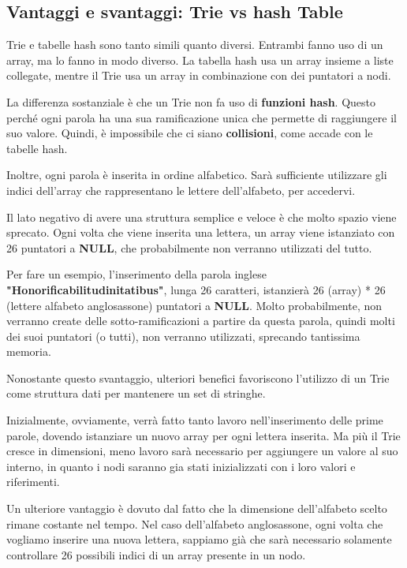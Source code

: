 \documentclass[a4paper, 12pt]{article}
\begin{document}
\subsection{Vantaggi e svantaggi: Trie vs hash Table}
Trie e tabelle hash sono tanto simili quanto diversi. Entrambi fanno uso di un array, ma lo fanno in modo diverso. La tabella hash usa un array insieme a liste collegate, mentre il Trie usa un array in combinazione con dei puntatori a nodi.

La differenza sostanziale è che un Trie non fa uso di \textbf{funzioni hash}. Questo perché ogni parola ha una sua ramificazione unica che permette di raggiungere il suo valore. Quindi, è impossibile che ci siano \textbf{collisioni}, come accade con le tabelle hash. 

Inoltre, ogni parola è inserita in ordine alfabetico. Sarà sufficiente utilizzare gli indici dell'array che rappresentano le lettere dell'alfabeto, per accedervi.

Il lato negativo di avere una struttura semplice e veloce è che molto spazio viene sprecato. Ogni volta che viene inserita una lettera, un array viene istanziato con 26 puntatori a \textbf{NULL}, che probabilmente non verranno utilizzati del tutto. 

Per fare un esempio, l'inserimento della parola inglese \textbf{"Honorificabilitudinitatibus"}, lunga 26 caratteri, istanzierà 26 (array) * 26 (lettere alfabeto anglosassone) puntatori a \textbf{NULL}. Molto probabilmente, non verranno create delle sotto-ramificazioni a partire da questa parola, quindi molti dei suoi puntatori (o tutti), non verranno utilizzati, sprecando tantissima memoria.

Nonostante questo svantaggio, ulteriori benefici favoriscono l'utilizzo di un Trie come struttura dati per mantenere un set di stringhe. 

Inizialmente, ovviamente, verrà fatto tanto lavoro nell'inserimento delle prime parole, dovendo istanziare un nuovo array per ogni lettera inserita. Ma più il Trie cresce in dimensioni, meno lavoro sarà necessario per aggiungere un valore al suo interno, in quanto i nodi saranno gia stati inizializzati con i loro valori e riferimenti.

Un ulteriore vantaggio è dovuto dal fatto che la dimensione dell'alfabeto scelto rimane costante nel tempo. Nel caso dell'alfabeto anglosassone, ogni volta che vogliamo inserire una nuova lettera, sappiamo già che sarà necessario solamente controllare 26 possibili indici di un array presente in un nodo.
\end{document}
